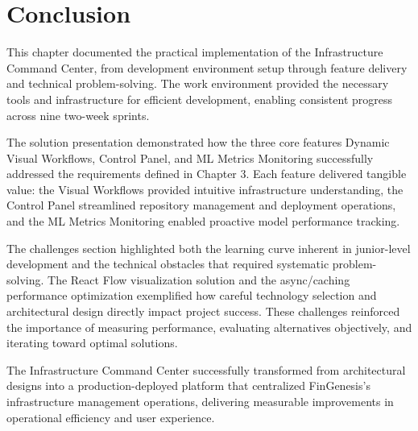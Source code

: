 \section{Conclusion}

This chapter documented the practical implementation of the Infrastructure Command Center, from development environment setup through feature delivery and technical problem-solving. The work environment provided the necessary tools and infrastructure for efficient development, enabling consistent progress across nine two-week sprints.

The solution presentation demonstrated how the three core features Dynamic Visual Workflows, Control Panel, and ML Metrics Monitoring successfully addressed the requirements defined in Chapter 3. Each feature delivered tangible value: the Visual Workflows provided intuitive infrastructure understanding, the Control Panel streamlined repository management and deployment operations, and the ML Metrics Monitoring enabled proactive model performance tracking.

The challenges section highlighted both the learning curve inherent in junior-level development and the technical obstacles that required systematic problem-solving. The React Flow visualization solution and the async/caching performance optimization exemplified how careful technology selection and architectural design directly impact project success. These challenges reinforced the importance of measuring performance, evaluating alternatives objectively, and iterating toward optimal solutions.

The Infrastructure Command Center successfully transformed from architectural designs into a production-deployed platform that centralized FinGenesis's infrastructure management operations, delivering measurable improvements in operational efficiency and user experience.